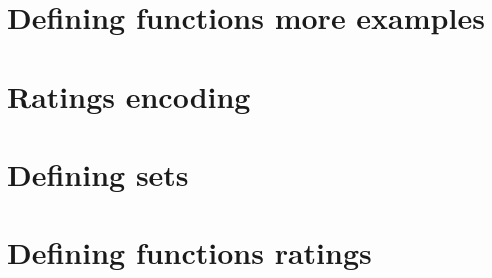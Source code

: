 
\section*{Defining functions more examples}

\vfill
\section*{Ratings encoding}

\vfill
\section*{Defining sets}

\vfill
\section*{Defining functions ratings}

\vfill
